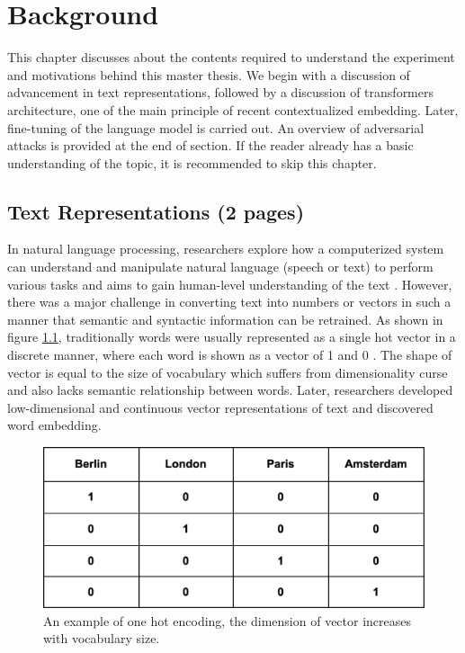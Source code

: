 \documentclass[%
	BCOR=8mm, %
	DIV=12,
	toc=bibliography, %
	toc=listof, %
	oneside, %
	egregdoesnotlikesansseriftitles, %
	]{scrbook}
\begin{document}
\chapter{Background}
\label{section:background}
This chapter discusses about the contents required to understand the experiment and motivations behind this master thesis. We begin with a discussion of advancement in text representations, followed by a discussion of transformers architecture, one of the main principle of recent contextualized embedding. Later, fine-tuning of the language model is carried out. An overview of adversarial attacks is provided at the end of  section. If the reader already has a basic understanding of the topic, it is recommended to skip this chapter.
\section{Text Representations (2 pages)}
\label{section: textrep}
In natural language processing, researchers explore how a computerized system can understand and manipulate natural language (speech or text) to perform various tasks\cite{chowdhury_natural_2003} and aims to gain human-level understanding of the text \cite{naseem_comprehensive_2020}. However, there was a major challenge in converting text into numbers or vectors in such a manner that semantic and syntactic information can be retrained. As shown in figure \ref{fig:onehot}, traditionally words were usually represented as a single hot vector in a discrete manner, where each word is shown as a vector of 1 and 0 \cite{salton_vector_1975}. The shape of vector is equal to the size of vocabulary which suffers from dimensionality curse and also lacks semantic relationship between words. Later, researchers developed low-dimensional and continuous vector representations of text and discovered word embedding.
\begin{figure}[h!]
    \centering
    \includegraphics[width=0.6\linewidth]{img/onehot.png}
    \caption[Example of one hot encoding.]{ An example of one hot encoding, the dimension of vector increases with vocabulary size.}
    \label{fig:onehot}
\end{figure}
\end{document}
